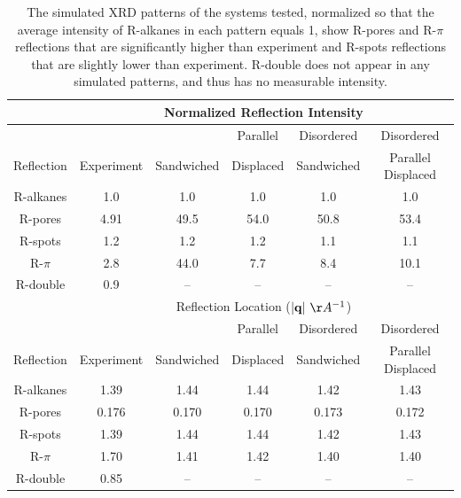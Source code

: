 \documentclass[journal=jpcbfk,manuscript=article]{achemso}
\begin{document}
  \begin{table}[h]
  \centering
  \begin{tabular}{c|ccccc}
  \toprule
 		     & \multicolumn{5}{c}{Normalized Reflection Intensity}                   \\
  \hline
             &            &            & Parallel  & Disordered & Disordered         \\
  Reflection & Experiment & Sandwiched & Displaced & Sandwiched & Parallel Displaced \\
  \midrule
  R-alkanes  & 1.0        &  1.0       &  1.0      &  1.0       &  1.0               \\
  R-pores    & 4.91       & 49.5       & 54.0      & 50.8       & 53.4               \\
  R-spots    & 1.2        &  1.2       &  1.2      &  1.1       &  1.1               \\
  R-$\pi$    & 2.8        & 44.0       &  7.7      &  8.4       & 10.1               \\
  R-double   & 0.9        &  --        & --        &  --        & --                 \\ 
  \hline
   		     & \multicolumn{5}{c}{Reflection Location ($|\mathbf{q}|~\AA^{-1}$)}     \\
  \hline
             &            &            & Parallel  & Disordered & Disordered         \\
  Reflection & Experiment & Sandwiched & Displaced & Sandwiched & Parallel Displaced \\
  \midrule
  R-alkanes  & 1.39       &  1.44      &  1.44     & 1.42       & 1.43               \\  
  R-pores    & 0.176      &  0.170     &  0.170    & 0.173      & 0.172              \\
  R-spots    & 1.39       &  1.44      &  1.44     & 1.42       & 1.43               \\
  R-$\pi$    & 1.70       &  1.41      &  1.42     & 1.40       & 1.40               \\
  R-double   & 0.85       &  --        & --        &  --        & --                 \\ 
  \bottomrule
  \end{tabular}
  \caption{The simulated XRD patterns of the systems tested, normalized so that
	  the average intensity of R-alkanes in each pattern equals 1, show R-pores and
	  R-$\pi$ reflections that are significantly higher than experiment and R-spots
	  reflections that are slightly lower than experiment. R-double does not appear
	  in any simulated patterns, and thus has no measurable intensity.}
  \label{table:relative_intensities_300K} 
  \end{table}  
  
\end{document}
